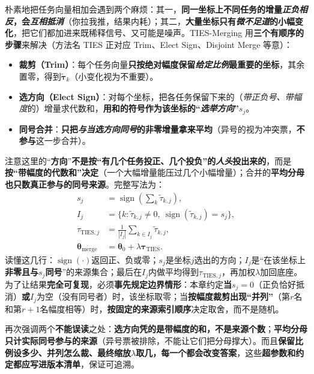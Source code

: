 朴素地把任务向量相加会遇到两个麻烦：其一，\textbf{同一坐标上不同任务的增量\emph{正负相反}，会\emph{互相抵消}}（你拉我推，结果内耗）；其二，\textbf{大量坐标只有\emph{微不足道}的小幅变化}，把它们都加进来既稀释信号、又可能是噪声。TIES-Merging 用\textbf{三个有顺序的步骤}来解决（方法名 TIES 正对应 Trim、Elect Sign、Disjoint Merge 等意）：
\begin{itemize}\item \textbf{裁剪（Trim）}：每个任务向量\textbf{只按绝对幅度保留\emph{给定比例}最重要的坐标}，其余置零，得到$\widetilde{\bm{\tau}}_k$（小变化视为不重要）。\item \textbf{选方向（Elect Sign）}：对每个坐标，把各任务保留下来的（\emph{带正负号、带幅度}的）增量求代数和，\textbf{用和的符号作为该坐标的“\emph{选举方向}”}$s_j$。\item \textbf{同号合并}：\textbf{只把\emph{与当选方向同号}的非零增量拿来平均}（异号的视为冲突票，\textbf{不参与}这一步合并）。\end{itemize}
注意这里的“\textbf{方向}”\textbf{不是按“有几个任务投正、几个投负”的\emph{人头}投出来的}，而是\textbf{按“带幅度的代数和”决定}（一个大幅增量能压过几个小幅增量）；合并的\textbf{平均分母也只数真正参与的同号来源}。完整写法为：
\begin{equation}
  \begin{aligned}
    s_j&=\operatorname{sign}\!\left(\sum_k\widetilde{\tau}_{k,j}\right),\\
    I_j&=\{k:\widetilde{\tau}_{k,j}\neq0,\
                    \operatorname{sign}(\widetilde{\tau}_{k,j})=s_j\},\\
    \tau_{\mathrm{TIES},j}
      &=\frac{1}{|I_j|}\sum_{k\in I_j}\widetilde{\tau}_{k,j},\\
    \bm{\theta}_{\mathrm{merge}}
      &=\bm{\theta}_0+\lambda\bm{\tau}_{\mathrm{TIES}}.
  \end{aligned}
  \label{eq:ket-integration-ties}
\end{equation}
读懂这几行：$\operatorname{sign}(\cdot)$返回正、负或零；$s_j$是坐标$j$选出的方向；$I_j$是“在该坐标上\textbf{非零且与$s_j$同号}”的来源集合；最后在$I_j$内做平均得到$\tau_{\mathrm{TIES},j}$，再加权$\lambda$加回底座。为了让结果\textbf{完全可复现}，必须\textbf{事先规定边界情形}：本章约定\textbf{当}$s_j=0$（正负恰好抵消）\textbf{或}$I_j$为空（没有同号者）时，该坐标取零；当\textbf{按幅度裁剪出现“并列”}（第$r$名和第$r+1$名幅度相等）时，\textbf{按固定的来源索引顺序}决定取舍，而不是随机。

再次强调两个\textbf{不能误读}之处：\textbf{选方向凭的是带幅度的和，不是来源个数}；\textbf{平均分母只计实际同号参与的来源}（异号票被排除，不能让它们把分母撑大）。而且\textbf{保留比例设多少、并列怎么裁、最终缩放$\lambda$取几，每一个都会改变答案}，这些\textbf{超参数和约定都应写进版本清单}，保证可追溯。

